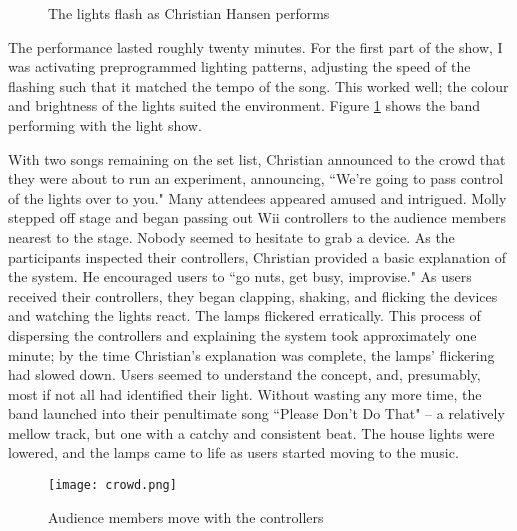 \begin{figure}
	\centering

	\hspace{0.1cm}

	\caption{The lights flash as Christian Hansen performs}

	\label{prototyping3.10}
\end{figure}

The performance lasted roughly twenty minutes. For the first part of the show, I was activating preprogrammed lighting patterns, adjusting the speed of the flashing such that it matched the tempo of the song. This worked well; the colour and brightness of the lights suited the environment. Figure \ref{prototyping3.10} shows the band performing with the light show.

With two songs remaining on the set list, Christian announced to the crowd that they were about to run an experiment, announcing, ``We're going to pass control of the lights over to you." Many attendees appeared amused and intrigued. Molly stepped off stage and began passing out Wii controllers to the audience members nearest to the stage. Nobody seemed to hesitate to grab a device. As the participants inspected their controllers, Christian provided a basic explanation of the system. He encouraged users to ``go nuts, get busy, improvise." As users received their controllers, they began clapping, shaking, and flicking the devices and watching the lights react. The lamps flickered erratically. This process of dispersing the controllers and explaining the system took approximately one minute; by the time Christian's explanation was complete, the lamps' flickering had slowed down. Users seemed to understand the concept, and, presumably, most if not all had identified their light. Without wasting any more time, the band launched into their penultimate song ``Please Don't Do That" -- a relatively mellow track, but one with a catchy and consistent beat. The house lights were lowered, and the lamps came to life as users started moving to the music.

\begin{figure}
	\centering

	\texttt{[image: crowd.png]}
	\caption{Audience members move with the controllers}

	\label{prototyping3.11}
\end{figure}

